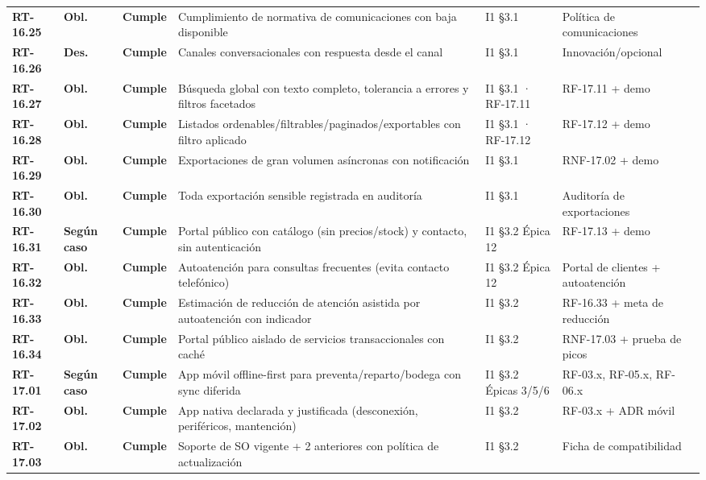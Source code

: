 \begin{small}
\begin{longtable}{@{}p{1.35cm} p{1.15cm} p{1.15cm} p{4.6cm} p{2.35cm} p{3.8cm}@{}}
\textbf{RT-16.25} & \textbf{Obl.} & \textbf{Cumple} & Cumplimiento de normativa de comunicaciones con baja disponible & I1 §3.1 & Pol\'itica de comunicaciones \\
\textbf{RT-16.26} & \textbf{Des.} & \textbf{Cumple} & Canales conversacionales con respuesta desde el canal & I1 §3.1 & Innovaci\'on/opcional \\
\textbf{RT-16.27} & \textbf{Obl.} & \textbf{Cumple} & B\'usqueda global con texto completo, tolerancia a errores y filtros facetados & I1 §3.1 · RF-17.11 & RF-17.11 + demo \\
\textbf{RT-16.28} & \textbf{Obl.} & \textbf{Cumple} & Listados ordenables/filtrables/paginados/exportables con filtro aplicado & I1 §3.1 · RF-17.12 & RF-17.12 + demo \\
\textbf{RT-16.29} & \textbf{Obl.} & \textbf{Cumple} & Exportaciones de gran volumen as\'incronas con notificaci\'on & I1 §3.1 & RNF-17.02 + demo \\
\textbf{RT-16.30} & \textbf{Obl.} & \textbf{Cumple} & Toda exportaci\'on sensible registrada en auditor\'ia & I1 §3.1 & Auditor\'ia de exportaciones \\
\textbf{RT-16.31} & \textbf{Según caso} & \textbf{Cumple} & Portal p\'ublico con cat\'alogo (sin precios/stock) y contacto, sin autenticaci\'on & I1 §3.2 \'Epica 12 & RF-17.13 + demo \\
\textbf{RT-16.32} & \textbf{Obl.} & \textbf{Cumple} & Autoatenci\'on para consultas frecuentes (evita contacto telef\'onico) & I1 §3.2 \'Epica 12 & Portal de clientes + autoatenci\'on \\
\textbf{RT-16.33} & \textbf{Obl.} & \textbf{Cumple} & Estimaci\'on de reducci\'on de atenci\'on asistida por autoatenci\'on con indicador & I1 §3.2 & RF-16.33 + meta de reducci\'on \\
\textbf{RT-16.34} & \textbf{Obl.} & \textbf{Cumple} & Portal p\'ublico aislado de servicios transaccionales con cach\'e & I1 §3.2 & RNF-17.03 + prueba de picos \\
\textbf{RT-17.01} & \textbf{Según caso} & \textbf{Cumple} & App m\'ovil offline-first para preventa/reparto/bodega con sync diferida & I1 §3.2 \'Epicas 3/5/6 & RF-03.x, RF-05.x, RF-06.x \\
\textbf{RT-17.02} & \textbf{Obl.} & \textbf{Cumple} & App nativa declarada y justificada (desconexi\'on, perif\'ericos, mantenci\'on) & I1 §3.2 & RF-03.x + ADR m\'ovil \\
\textbf{RT-17.03} & \textbf{Obl.} & \textbf{Cumple} & Soporte de SO vigente + 2 anteriores con pol\'itica de actualizaci\'on & I1 §3.2 & Ficha de compatibilidad \\

\end{longtable}
\end{small}
